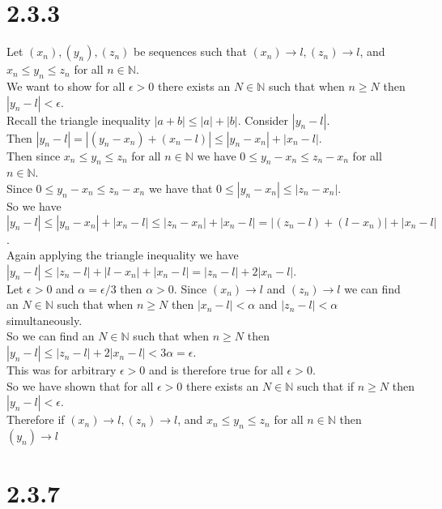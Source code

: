 \documentclass{article}
\begin{document}
\section*{2.3.3}
\begin{center}
    \doublespacing
    Let $(x_n), (y_n), (z_n)$ be sequences such that $(x_n)\rightarrow l, (z_n)\rightarrow l$, and $x_n\leq y_n\leq z_n$ for all $n\in\mathbb{N}$.
    \\We want to show for all $\epsilon > 0$ there exists an $N\in\mathbb{N}$ such that when $n\geq N$ then $|y_n - l| <\epsilon$.
    \\Recall the triangle inequality $|a+b|\leq |a| + |b|$. Consider $|y_n - l|$.
    \\Then  $|y_n - l| = |(y_n - x_n) + (x_n - l)|\leq |y_n - x_n| + |x_n - l|$.
    \\Then since $x_n\leq y_n\leq z_n$ for all $n\in\mathbb{N}$ we have $0\leq y_n - x_n\leq z_n - x_n$ for all $n\in\mathbb{N}$.
    \\Since $0\leq y_n - x_n\leq z_n - x_n$ we have that $0\leq |y_n - x_n|\leq |z_n - x_n|$.
    \\So we have $|y_n - l|\leq |y_n - x_n| + |x_n - l|\leq |z_n - x_n| + |x_n - l| = |(z_n - l) + (l - x_n)| + |x_n - l|$.
    \\Again applying the triangle inequality we have $|y_n - l|\leq |z_n - l| + |l - x_n| + |x_n - l| = |z_n - l| + 2|x_n - l|$.
    \\Let $\epsilon > 0$ and $\alpha = \epsilon /3$ then $\alpha > 0$. Since $(x_n)\rightarrow l$ and $(z_n)\rightarrow l$ we can find an $N\in\mathbb{N}$ such that when $n\geq N$ then $|x_n - l| <\alpha$ and $|z_n - l| <\alpha$ simultaneously.
    \\So we can find an $N\in\mathbb{N}$ such that when $n\geq N$ then $|y_n - l|\leq |z_n - l| + 2|x_n - l| < 3\alpha =\epsilon$.
    \\This was for arbitrary $\epsilon > 0$ and is therefore true for all $\epsilon > 0$.
    \\So we have shown that for all $\epsilon > 0$ there exists an $N\in\mathbb{N}$ such that if $n\geq N$ then $|y_n - l| <\epsilon$.
    \\Therefore if $(x_n)\rightarrow l, (z_n)\rightarrow l$, and $x_n\leq y_n\leq z_n$ for all $n\in\mathbb{N}$ then $(y_n)\rightarrow l$ \qedsymbol
\end{center}


\newpage
\section*{2.3.7}
\end{document}
